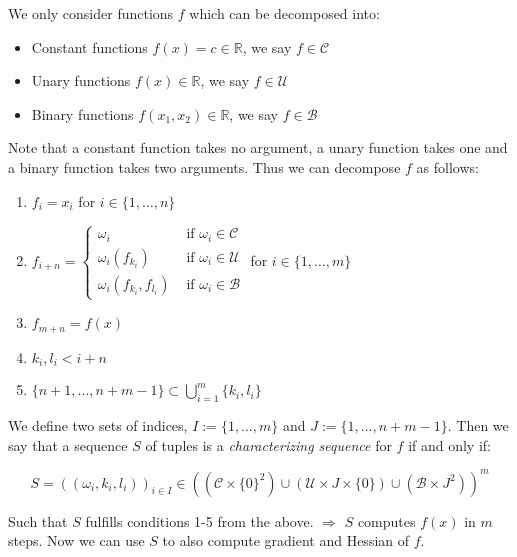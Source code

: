 \documentclass[11pt,a4paper]{article}
\def\R{{\mathbb R}}
\theoremstyle{definition} %
\begin{document}
We only consider functions $f$ which can be decomposed into:

\begin{itemize}
	\item Constant functions $f(x) = c \in \R$, we say $f \in \mathcal{C}$
	\item Unary functions $f(x) \in \R$, we say $f \in \mathcal{U}$
	\item Binary functions $f(x_1, x_2) \in \R$, we say $f \in \mathcal{B}$
\end{itemize}

Note that a constant function takes no argument, a unary function takes one
and a binary function takes two arguments.
Thus we can decompose $f$ as follows:

\begin{enumerate}[(1)]
	\item $f_i = x_i$ for $i \in \{
		      1, \ldots, n
		      \} $
	\item $f_{i + n} = \begin{cases}
			      \omega_i                    & \text{ if } \omega_i \in \mathcal{C} \\
			      \omega_i (f_{k_i})          & \text{ if } \omega_i \in \mathcal{U} \\
			      \omega_i (f_{k_i}, f_{l_i}) & \text{ if } \omega_i \in \mathcal{B}
		      \end{cases}$
	      \qquad for $i \in \{
		      1, \ldots, m
		      \}$
	\item $f_{m + n} = f(x)$
	\item $k_i, l_i < i + n$  
	\item $\{
		      n+1, \ldots, n+m - 1
		      \} \subset \bigcup_{i=1}^{m} \{
		      k_i, l_i
		      \}$
\end{enumerate}

We define two sets of indices, $I := \{
	1, \ldots, m
	\} $ and $J := \{
	1, \ldots, n+m-1
	\} $.
Then we say that a sequence $S$ of tuples is a \textit{characterizing sequence}
for $f$ if and only if:

\[
	S = \left(
	(\omega_i, k_i, l_i)
	\right)_{i \in I}
	\in \left(
	\left(
		\mathcal{C} \times \{
		0
		\}^2
		\right) \cup
	\left(
		\mathcal{U} \times J \times \{
		0
		\} \right) \cup
	\left(
		\mathcal{B} \times J^2
		\right)
	\right) ^m
\]

Such that $S$ fulfills conditions 1-5 from the above.
$\Rightarrow$ $S$ computes $f(x)$ in $m$ steps.
Now we can use $S$ to also compute gradient and Hessian of $f$.
\end{document}
